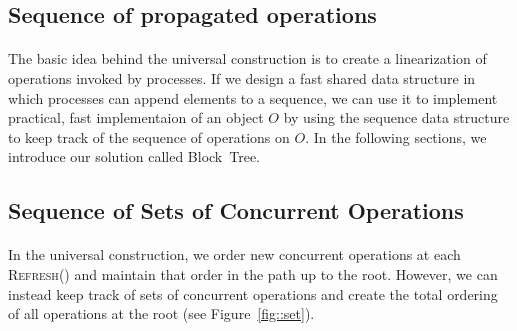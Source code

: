 \documentclass[10pt]{article}
\newtheorem{lemma}[theorem]{Lemma}
\theoremstyle{definition}
\begin{document}
\subsection{Sequence of propagated operations}
\paragraph{}
The basic idea behind the universal construction is to create a linearization of operations invoked by processes. If we design a fast shared data structure in which processes can append elements to a sequence, we can use it to implement practical, fast implementaion of an object $O$ by using the sequence data structure to keep track of the sequence of operations  on $O$. In the following sections, we introduce our solution called Block~Tree.


\subsection{Sequence of Sets of Concurrent Operations \label{subsec::block}}
\paragraph{}
 In the universal construction, we order new concurrent operations at each \textsc{Refresh}() and maintain that order in the path up to the root. However, we can instead keep track of sets of concurrent operations and create the total ordering of all operations at the root (see Figure~\ref{fig::set}).
 
\end{document}

